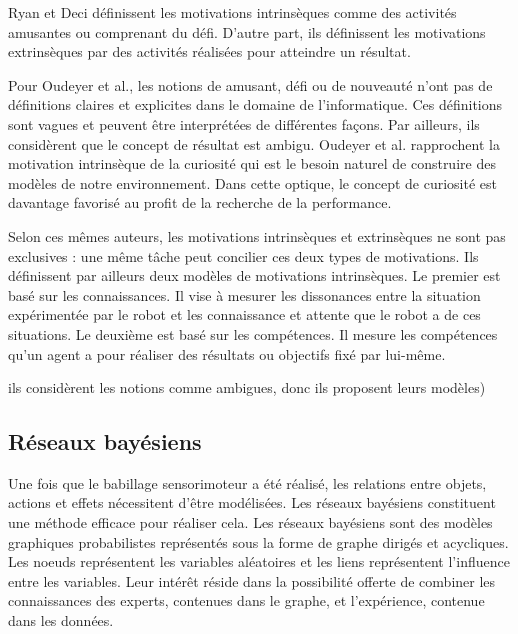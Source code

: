 \documentclass{llncs}
\begin{document}



Ryan et Deci définissent les motivations intrinsèques comme des activités amusantes ou comprenant du défi.
D'autre part, ils définissent les motivations extrinsèques par des activités réalisées pour atteindre un résultat.

Pour Oudeyer et al., les notions de \og{}amusant\fg{}, \og{}défi\fg{} ou de \og{}nouveauté\fg{} n'ont pas de définitions claires et explicites dans le domaine de l'informatique.
Ces définitions sont vagues et peuvent être interprétées de différentes façons.
Par ailleurs, ils considèrent que le concept de résultat est ambigu.
Oudeyer et al. rapprochent la motivation intrinsèque de la curiosité qui est le besoin naturel de construire des modèles de notre environnement.
Dans cette optique, le concept de curiosité est davantage favorisé au profit de la recherche de la performance.

Selon ces mêmes auteurs, les motivations intrinsèques et extrinsèques ne sont pas exclusives : une même tâche peut concilier ces deux types de motivations.
Ils définissent par ailleurs deux modèles de motivations intrinsèques.
Le premier est basé sur les connaissances.
Il vise à mesurer les dissonances entre la situation expérimentée par le robot et les connaissance et attente que le robot a de ces situations.
Le deuxième est basé sur les compétences. Il mesure les compétences qu'un agent a pour réaliser des résultats ou objectifs fixé par lui-même.


ils considèrent les notions comme ambigues, donc ils proposent leurs modèles)


\subsection{Réseaux bayésiens}

Une fois que le babillage sensorimoteur a été réalisé, les relations entre objets, actions et effets nécessitent d'être modélisées.
Les réseaux bayésiens constituent une méthode efficace pour réaliser cela. 
Les réseaux bayésiens sont des modèles graphiques probabilistes représentés sous la forme de graphe dirigés et acycliques.
Les noeuds représentent les variables aléatoires et les liens représentent l'influence entre les variables.
Leur intérêt réside dans la possibilité offerte de combiner les connaissances des experts, contenues dans le graphe, et l'expérience, contenue dans les données.
\end{document}
